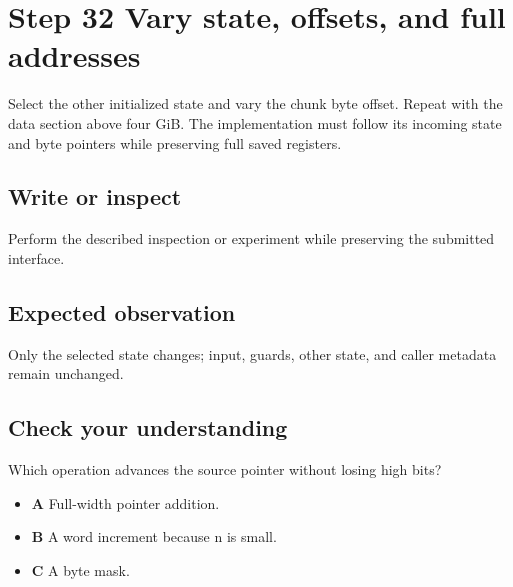 \section{Step 32 Vary state, offsets, and full addresses}\label{utf8-s32}

Select the other initialized state and vary the chunk byte offset. Repeat with the data section above four GiB. The implementation must follow its incoming state and byte pointers while preserving full saved registers.

\subsection{Write or inspect}
Perform the described inspection or experiment while preserving the submitted interface.

\subsection{Expected observation}
Only the selected state changes; input, guards, other state, and caller metadata remain unchanged.

\subsection{Check your understanding}
Which operation advances the source pointer without losing high bits?

\begin{itemize}
  \item \textbf{A} Full-width pointer addition.
  \item \textbf{B} A word increment because n is small.
  \item \textbf{C} A byte mask.
\end{itemize}
